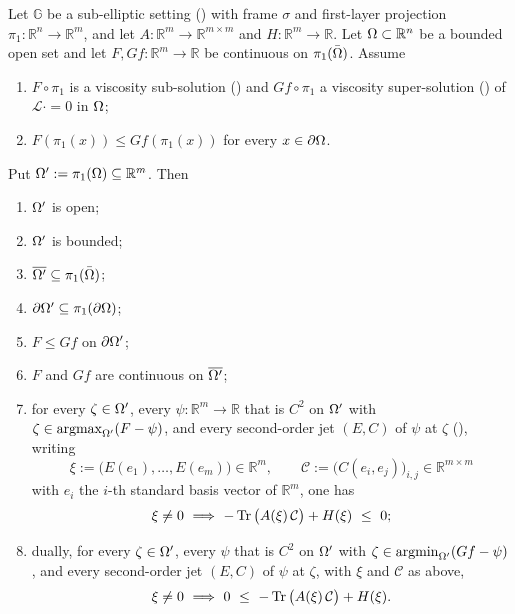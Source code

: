 \begin{theorem}
Let $\mathbb G$ be a sub-elliptic setting () with frame $\sigma$ and
first-layer projection $\pi_1:\mathbb R^{n}\to\mathbb R^{m}$, and let
$A:\mathbb R^{m}\to\mathbb R^{m\times m}$ and $H:\mathbb R^{m}\to\mathbb R$. Let
$\Omega\subset\mathbb R^{n}$ be a bounded open set and let
$F,Gf:\mathbb R^{m}\to\mathbb R$ be continuous on $\pi_1(\bar{\Omega})$. Assume
\begin{enumerate}
\item $F\circ\pi_1$ is a viscosity sub-solution () and $Gf\circ\pi_1$ a
  viscosity super-solution () of $\mathcal L\cdot=0$ in $\Omega$;
\item $F(\pi_1(x))\le Gf(\pi_1(x))$ for every $x\in\partial\Omega$.
\end{enumerate}
Put $\Omega':=\pi_1(\Omega)\subseteq\mathbb R^{m}$. Then
\begin{enumerate}
\item[(1)] $\Omega'$ is open;
\item[(2)] $\Omega'$ is bounded;
\item[(3)] $\overline{\Omega'}\subseteq\pi_1(\bar{\Omega})$;
\item[(4)] $\partial\Omega'\subseteq\pi_1(\partial\Omega)$;
\item[(5)] $F\le Gf$ on $\partial\Omega'$;
\item[(6)] $F$ and $Gf$ are continuous on $\overline{\Omega'}$;
\item[(7)] for every $\zeta\in\Omega'$, every $\psi:\mathbb R^{m}\to\mathbb R$ that is $C^{2}$
  on $\Omega'$ with $\zeta\in\operatorname*{argmax}_{\Omega'}(F-\psi)$, and every second-order jet $(E,C)$ of
  $\psi$ at $\zeta$ (), writing
  \[
   \xi:=\big(E(e_1),\ldots,E(e_m)\big)\in\mathbb R^{m},\qquad
   \mathcal C:=\big(C(e_i,e_j)\big)_{i,j}\in\mathbb R^{m\times m}
  \]
  with $e_i$ the $i$-th standard basis vector of $\mathbb R^{m}$, one has
  \[
   \xi\ne0\ \Longrightarrow\ -\Tr\big(A(\xi)\,\mathcal C\big)+H(\xi)\ \le\ 0 ;
  \]
\item[(8)] dually, for every $\zeta\in\Omega'$, every $\psi$ that is $C^{2}$ on $\Omega'$ with
  $\zeta\in\operatorname*{argmin}_{\Omega'}(Gf-\psi)$, and every second-order jet $(E,C)$ of $\psi$ at $\zeta$,
  with $\xi$ and $\mathcal C$ as above,
  \[
   \xi\ne0\ \Longrightarrow\ 0\ \le\ -\Tr\big(A(\xi)\,\mathcal C\big)+H(\xi) .
  \]
\end{enumerate}
\end{theorem}
